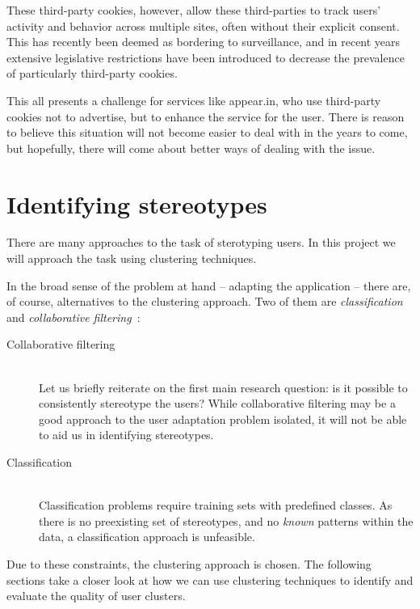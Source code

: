       These third-party cookies, however, allow these third-parties to track users' activity and behavior across multiple sites, often without their explicit consent. This has recently been deemed as bordering to surveillance, and in recent years extensive legislative restrictions have been introduced to decrease the prevalence of particularly third-party cookies.

      This all presents a challenge for services like appear.in, who use third-party cookies not to advertise, but to enhance the service for the user. There is reason to believe this situation will not become easier to deal with in the years to come, but hopefully, there will come about better ways of dealing with the issue.

\section{Identifying stereotypes}
\label{survey:identifying_sterotypes}

  There are many approaches to the task of sterotyping users. In this project we will approach the task using clustering techniques.

  In the broad sense of the problem at hand -- adapting the application -- there are, of course, alternatives to the clustering approach. Two of them are \emph{classification} and \emph{collaborative filtering}~\cite{Mitchell1997}:

  \begin{description}
    \item[Collaborative filtering] \hfill \\
      Let us briefly reiterate on the first main research question: is it possible to consistently stereotype the users? While collaborative filtering may be a good approach to the user adaptation problem isolated, it will not be able to aid us in identifying stereotypes.
    \item[Classification] \hfill \\
      Classification problems require training sets with predefined classes. As there is no preexisting set of stereotypes, and no \emph{known} patterns within the data, a classification approach is unfeasible.
  \end{description}

  Due to these constraints, the clustering approach is chosen. The following sections take a closer look at how we can use clustering techniques to identify and evaluate the quality of user clusters.

